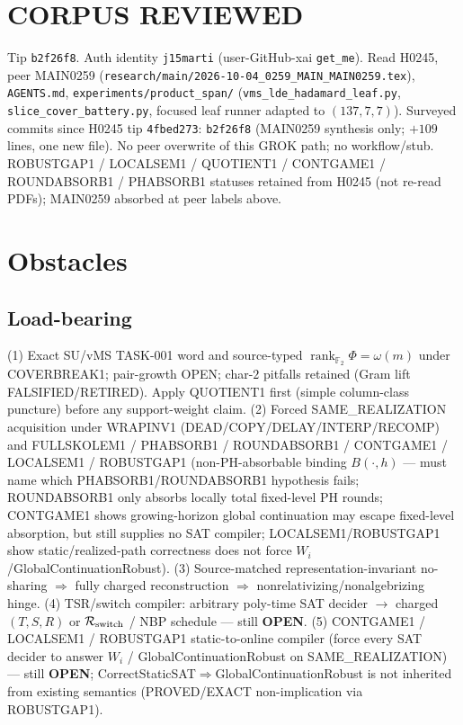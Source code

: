 \documentclass[11pt]{article}
\begin{document}
\section*{CORPUS REVIEWED}
Tip \texttt{b2f26f8}. Auth identity \texttt{j15marti} (user-GitHub-xai \texttt{get\_me}).
Read H0245, peer MAIN0259
(\texttt{research/main/2026-10-04\_0259\_MAIN\_MAIN0259.tex}),
\texttt{AGENTS.md}, \texttt{experiments/product\_span/}
(\texttt{vms\_lde\_hadamard\_leaf.py}, \texttt{slice\_cover\_battery.py}, focused leaf runner adapted to $(137,7,7)$).
Surveyed commits since H0245 tip \texttt{4fbed273}:
\texttt{b2f26f8} (MAIN0259 synthesis only; $+109$ lines, one new file).
No peer overwrite of this GROK path; no workflow/stub.
ROBUSTGAP1 / LOCALSEM1 / QUOTIENT1 / CONTGAME1 / ROUNDABSORB1 / PHABSORB1 statuses retained
from H0245 (not re-read PDFs); MAIN0259 absorbed at peer labels above.

\section*{Obstacles}
\subsection*{Load-bearing}
(1) Exact SU/vMS TASK-001 word and source-typed
$\operatorname{rank}_{\mathbb F_2}\Phi=\omega(m)$ under COVERBREAK1; pair-growth OPEN;
char-$2$ pitfalls retained (Gram lift FALSIFIED/RETIRED). Apply QUOTIENT1 first
(simple column-class puncture) before any support-weight claim.
(2) Forced SAME\_REALIZATION acquisition under WRAPINV1
(DEAD/COPY/DELAY/INTERP/RECOMP) and FULLSKOLEM1 / PHABSORB1 / ROUNDABSORB1 / CONTGAME1 /
LOCALSEM1 / ROBUSTGAP1
(non-PH-absorbable binding $B(\cdot,h)$ --- must name which PHABSORB1/ROUNDABSORB1
hypothesis fails; ROUNDABSORB1 only absorbs locally total fixed-level PH rounds;
CONTGAME1 shows growing-horizon global continuation may escape fixed-level absorption,
but still supplies no SAT compiler; LOCALSEM1/ROBUSTGAP1 show static/realized-path
correctness does not force $W_i$/GlobalContinuationRobust).
(3) Source-matched representation-invariant no-sharing $\Rightarrow$ fully charged reconstruction
$\Rightarrow$ nonrelativizing/nonalgebrizing hinge.
(4) TSR/switch compiler: arbitrary poly-time SAT decider $\to$ charged $(T,S,R)$ or
$\mathcal R_{\rm switch}$ / NBP schedule --- still \textbf{OPEN}.
(5) CONTGAME1 / LOCALSEM1 / ROBUSTGAP1 static-to-online compiler (force every SAT decider to
answer $W_i$ / GlobalContinuationRobust on SAME\_REALIZATION) --- still \textbf{OPEN};
CorrectStaticSAT$\Rightarrow$GlobalContinuationRobust is not inherited from existing semantics
(PROVED/EXACT non-implication via ROBUSTGAP1).
\end{document}
